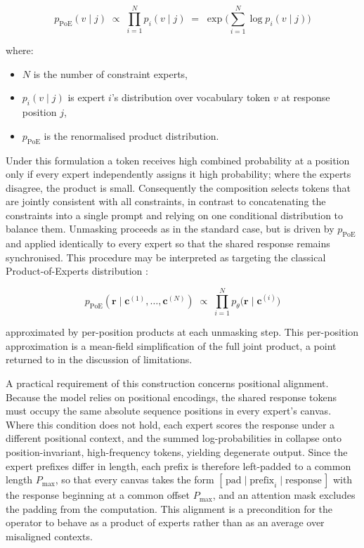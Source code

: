 \documentclass[a4paper,twoside,12pt]{report}
\begin{document}
\begin{equation}
p_{\mathrm{PoE}}(v \mid j)
\;\propto\;
\prod_{i=1}^{N} p_i(v \mid j)
\;=\;
\exp\!\Big(\textstyle\sum_{i=1}^{N} \log p_i(v \mid j)\Big)
\label{eq:poe}
\end{equation}

where:
\begin{itemize}
  \item \(N\) is the number of constraint experts,
  \item \(p_i(v \mid j)\) is expert \(i\)'s distribution over vocabulary token
        \(v\) at response position \(j\),
  \item \(p_{\mathrm{PoE}}\) is the renormalised product distribution.
\end{itemize}

Under this formulation a token receives high combined probability at a position
only if every expert independently assigns it high probability; where the
experts disagree, the product is small. Consequently the composition selects
tokens that are jointly consistent with all constraints, in contrast to
concatenating the constraints into a single prompt and relying on one
conditional distribution to balance them. Unmasking proceeds as in the standard
case, but is driven by \(p_{\mathrm{PoE}}\) and applied identically to every
expert so that the shared response remains synchronised. This procedure may be
interpreted as targeting the classical Product-of-Experts distribution
\citep{hinton2002training}:

\begin{equation}
p_{\mathrm{PoE}}(\mathbf{r}\mid \mathbf{c}^{(1)},\dots,\mathbf{c}^{(N)})
\;\propto\;
\prod_{i=1}^{N} p_\theta\big(\mathbf{r}\mid \mathbf{c}^{(i)}\big)
\end{equation}

approximated by per-position products at each unmasking step. This
per-position approximation is a mean-field simplification of the full joint
product, a point returned to in the discussion of limitations.

A practical requirement of this construction concerns positional alignment.
Because the model relies on positional encodings, the shared response tokens
must occupy the same absolute sequence positions in every expert's canvas.
Where this condition does not hold, each expert scores the response under a
different positional context, and the summed log-probabilities in
 collapse onto position-invariant, high-frequency tokens, yielding
degenerate output. Since the expert prefixes differ in length, each prefix is
therefore left-padded to a common length \(P_{\max}\), so that every canvas
takes the form \([\,\text{pad} \mid \text{prefix}_i \mid
\text{response}\,]\) with the response beginning at a common offset
\(P_{\max}\), and an attention mask excludes the padding from the computation.
This alignment is a precondition for the operator to behave as a product of
experts rather than as an average over misaligned contexts.
\end{document}
